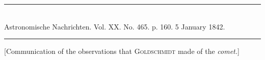 \clearpage
\hypertarget{native-469-notice1842}{}
\begin{center}
\rule{0.55\linewidth}{0.4pt}\\[2pt]
Astronomische Nachrichten. Vol. XX. No. 465. p. 160. 5 January 1842.\\[2pt]
\rule{0.55\linewidth}{0.4pt}
\end{center}

[Communication of the observations that \textsc{Goldschmidt} made of the \emph{comet.}]

